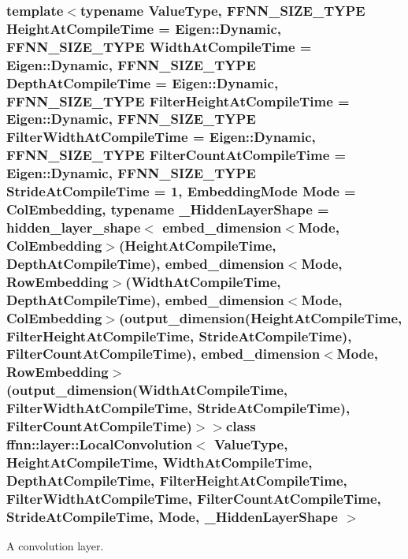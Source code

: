 \subsubsection*{template$<$typename Value\-Type, F\-F\-N\-N\-\_\-\-S\-I\-Z\-E\-\_\-\-T\-Y\-P\-E Height\-At\-Compile\-Time = Eigen\-::\-Dynamic, F\-F\-N\-N\-\_\-\-S\-I\-Z\-E\-\_\-\-T\-Y\-P\-E Width\-At\-Compile\-Time = Eigen\-::\-Dynamic, F\-F\-N\-N\-\_\-\-S\-I\-Z\-E\-\_\-\-T\-Y\-P\-E Depth\-At\-Compile\-Time = Eigen\-::\-Dynamic, F\-F\-N\-N\-\_\-\-S\-I\-Z\-E\-\_\-\-T\-Y\-P\-E Filter\-Height\-At\-Compile\-Time = Eigen\-::\-Dynamic, F\-F\-N\-N\-\_\-\-S\-I\-Z\-E\-\_\-\-T\-Y\-P\-E Filter\-Width\-At\-Compile\-Time = Eigen\-::\-Dynamic, F\-F\-N\-N\-\_\-\-S\-I\-Z\-E\-\_\-\-T\-Y\-P\-E Filter\-Count\-At\-Compile\-Time = Eigen\-::\-Dynamic, F\-F\-N\-N\-\_\-\-S\-I\-Z\-E\-\_\-\-T\-Y\-P\-E Stride\-At\-Compile\-Time = 1, Embedding\-Mode Mode = Col\-Embedding, typename \-\_\-\-Hidden\-Layer\-Shape = hidden\-\_\-layer\-\_\-shape$<$              embed\-\_\-dimension$<$\-Mode, Col\-Embedding$>$(\-Height\-At\-Compile\-Time, Depth\-At\-Compile\-Time),              embed\-\_\-dimension$<$\-Mode, Row\-Embedding$>$(\-Width\-At\-Compile\-Time,  Depth\-At\-Compile\-Time),              embed\-\_\-dimension$<$\-Mode, Col\-Embedding$>$(output\-\_\-dimension(\-Height\-At\-Compile\-Time, Filter\-Height\-At\-Compile\-Time, Stride\-At\-Compile\-Time), Filter\-Count\-At\-Compile\-Time),              embed\-\_\-dimension$<$\-Mode, Row\-Embedding$>$(output\-\_\-dimension(\-Width\-At\-Compile\-Time,  Filter\-Width\-At\-Compile\-Time,  Stride\-At\-Compile\-Time), Filter\-Count\-At\-Compile\-Time)$>$$>$class ffnn\-::layer\-::\-Local\-Convolution$<$ Value\-Type, Height\-At\-Compile\-Time, Width\-At\-Compile\-Time, Depth\-At\-Compile\-Time, Filter\-Height\-At\-Compile\-Time, Filter\-Width\-At\-Compile\-Time, Filter\-Count\-At\-Compile\-Time, Stride\-At\-Compile\-Time, Mode, \-\_\-\-Hidden\-Layer\-Shape $>$}

A convolution layer. 


